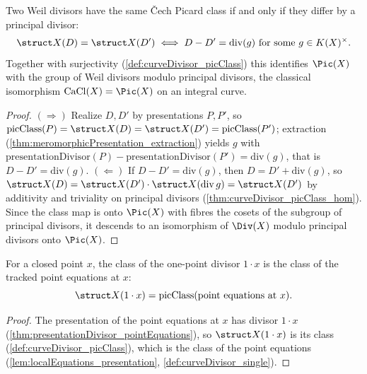 \begin{theorem}
  \label{thm:curveDivisor_picClass_eq_iff}
  \leanok
  Two Weil divisors have the same \v Cech Picard class if and only if they differ by a principal
  divisor:
  \[
    \struct X(D) = \struct X(D') \iff D - D' = \mathrm{div}(g) \text{ for some } g \in
      K(X)^{\times}.
  \]
  Together with surjectivity (\ref{def:curveDivisor_picClass}) this identifies \(\Pic(X)\) with the
  group of Weil divisors modulo principal divisors, the classical isomorphism
  \(\mathrm{CaCl}(X) = \Pic(X)\) on an integral curve.
\end{theorem}
\begin{proof}
  \leanok
  \((\Rightarrow)\) Realize \(D, D'\) by presentations \(P, P'\), so \(\mathrm{picClass}(P) =
  \struct X(D) = \struct X(D') = \mathrm{picClass}(P')\); extraction
  (\ref{thm:meromorphicPresentation_extraction}) yields \(g\) with
  \(\mathrm{presentationDivisor}(P) - \mathrm{presentationDivisor}(P') = \mathrm{div}(g)\), that is
  \(D - D' = \mathrm{div}(g)\). \((\Leftarrow)\) If \(D - D' = \mathrm{div}(g)\), then \(D = D' +
  \mathrm{div}(g)\), so \(\struct X(D) = \struct X(D') \cdot \struct X(\mathrm{div}\, g) = \struct
  X(D')\) by additivity and triviality on principal divisors
  (\ref{thm:curveDivisor_picClass_hom}). Since the class map is onto \(\Pic(X)\) with fibres the
  cosets of the subgroup of principal divisors, it descends to an isomorphism of \(\Div(X)\) modulo
  principal divisors onto \(\Pic(X)\).
\end{proof}

\begin{theorem}
  \label{thm:curveDivisor_picClass_single}
  \leanok
  For a closed point \(x\), the class of the one-point divisor \(1 \cdot x\) is the class of the
  tracked point equations at \(x\):
  \[
    \struct X(1 \cdot x) = \mathrm{picClass}(\text{point equations at } x).
  \]
\end{theorem}
\begin{proof}
  \leanok
  The presentation of the point equations at \(x\) has divisor \(1 \cdot x\)
  (\ref{thm:presentationDivisor_pointEquations}), so \(\struct X(1 \cdot x)\) is its class
  (\ref{def:curveDivisor_picClass}), which is the class of the point equations
  (\ref{lem:localEquations_presentation}, \ref{def:curveDivisor_single}).
\end{proof}

